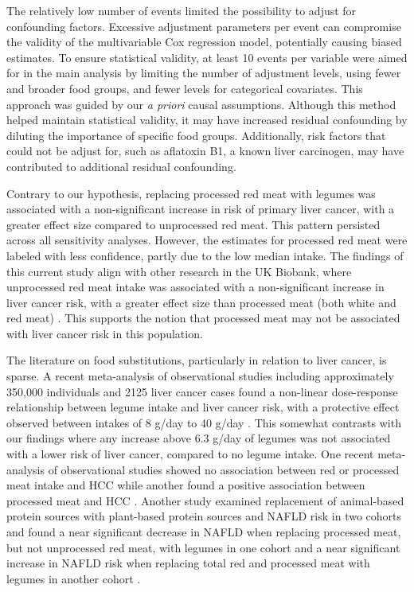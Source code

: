 \documentclass[
]{article}
\begin{document}
The relatively low number of events limited the possibility to adjust
for confounding factors. Excessive adjustment parameters per event can
compromise the validity of the multivariable Cox regression model,
potentially causing biased estimates. To ensure statistical validity, at
least 10 events per variable were aimed for in the main analysis by
limiting the number of adjustment levels, using fewer and broader food
groups, and fewer levels for categorical covariates. This approach was
guided by our \emph{a priori} causal assumptions. Although this method helped
maintain statistical validity, it may have increased residual
confounding by diluting the importance of specific food groups.
Additionally, risk factors that could not be adjust for, such as
aflatoxin B1, a known liver carcinogen, may have contributed to
additional residual confounding.

Contrary to our hypothesis, replacing processed red meat with legumes
was associated with a non-significant increase in risk of primary liver
cancer, with a greater effect size compared to unprocessed red meat.
This pattern persisted across all sensitivity analyses. However, the
estimates for processed red meat were labeled with less confidence,
partly due to the low median intake. The findings of this current study
align with other research in the UK Biobank, where unprocessed red meat
intake was associated with a non-significant increase in liver cancer
risk, with a greater effect size than processed meat (both white and red
meat) \autocite{Knuppel2020}. This supports the notion that processed meat may
not be associated with liver cancer risk in this population.

The literature on food substitutions, particularly in relation to liver
cancer, is sparse. A recent meta-analysis of observational studies
including approximately 350,000 individuals and 2125 liver cancer cases
found a non-linear dose-response relationship between legume intake and
liver cancer risk, with a protective effect observed between intakes of
8 g/day to 40 g/day \autocite{liu2023a}. This somewhat contrasts with our
findings where any increase above 6.3 g/day of legumes was not
associated with a lower risk of liver cancer, compared to no legume
intake. One recent meta-analysis of observational studies showed no
association between red or processed meat intake and HCC \autocite{Di2023} while
another found a positive association between processed meat and HCC
\autocite{Yu2022}. Another study examined replacement of animal-based protein
sources with plant-based protein sources and NAFLD risk in two cohorts
and found a near significant decrease in NAFLD when replacing processed
meat, but not unprocessed red meat, with legumes in one cohort and a
near significant increase in NAFLD risk when replacing total red and
processed meat with legumes in another cohort \autocite{Zhang2023}.
\end{document}
